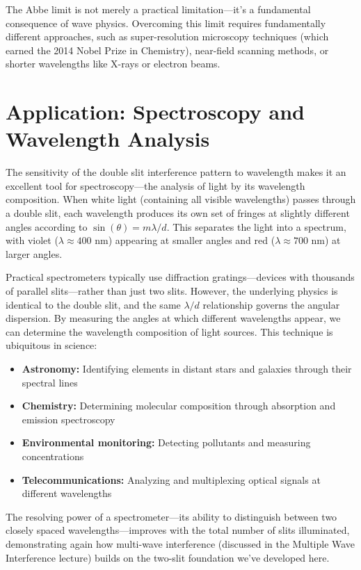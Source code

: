 \documentclass[
  a4paper,
]{book}
\providecommand{\tightlist}{%
  \setlength{\itemsep}{0pt}\setlength{\parskip}{0pt}}
\begin{document}
The Abbe limit is not merely a practical limitation---it's a fundamental
consequence of wave physics. Overcoming this limit requires
fundamentally different approaches, such as super-resolution microscopy
techniques (which earned the 2014 Nobel Prize in Chemistry), near-field
scanning methods, or shorter wavelengths like X-rays or electron beams.

\section{Application: Spectroscopy and Wavelength
Analysis}\label{application-spectroscopy-and-wavelength-analysis}

The sensitivity of the double slit interference pattern to wavelength
makes it an excellent tool for spectroscopy---the analysis of light by
its wavelength composition. When white light (containing all visible
wavelengths) passes through a double slit, each wavelength produces its
own set of fringes at slightly different angles according to
\(\sin(\theta) = m\lambda/d\). This separates the light into a spectrum,
with violet (\(\lambda \approx 400\) nm) appearing at smaller angles and
red (\(\lambda \approx 700\) nm) at larger angles.

Practical spectrometers typically use diffraction gratings---devices
with thousands of parallel slits---rather than just two slits. However,
the underlying physics is identical to the double slit, and the same
\(\lambda/d\) relationship governs the angular dispersion. By measuring
the angles at which different wavelengths appear, we can determine the
wavelength composition of light sources. This technique is ubiquitous in
science:

\begin{itemize}
\tightlist
\item
  \textbf{Astronomy:} Identifying elements in distant stars and galaxies
  through their spectral lines
\item
  \textbf{Chemistry:} Determining molecular composition through
  absorption and emission spectroscopy
\item
  \textbf{Environmental monitoring:} Detecting pollutants and measuring
  concentrations
\item
  \textbf{Telecommunications:} Analyzing and multiplexing optical
  signals at different wavelengths
\end{itemize}

The resolving power of a spectrometer---its ability to distinguish
between two closely spaced wavelengths---improves with the total number
of slits illuminated, demonstrating again how multi-wave interference
(discussed in the Multiple Wave Interference lecture) builds on the
two-slit foundation we've developed here.
\end{document}
